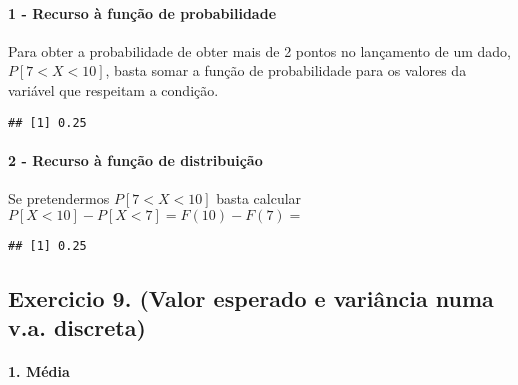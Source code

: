 \documentclass[
]{article}
\newenvironment{Shaded}{\begin{snugshade}}{\end{snugshade}}
\newcommand{\DecValTok}[1]{\textcolor[rgb]{0.00,0.00,0.81}{#1}}
\newcommand{\FunctionTok}[1]{\textcolor[rgb]{0.00,0.00,0.00}{#1}}
\newcommand{\NormalTok}[1]{#1}
\newcommand{\SpecialCharTok}[1]{\textcolor[rgb]{0.00,0.00,0.00}{#1}}
\begin{document}
\hypertarget{recurso-uxe0-funuxe7uxe3o-de-probabilidade-2}{%
\paragraph{1 - Recurso à função de
probabilidade}\label{recurso-uxe0-funuxe7uxe3o-de-probabilidade-2}}

Para obter a probabilidade de obter mais de 2 pontos no lançamento de um
dado, \(P[7 < X < 10]\), basta somar a função de probabilidade para os
valores da variável que respeitam a condição.

\begin{Shaded}
\end{Shaded}

\begin{verbatim}
## [1] 0.25
\end{verbatim}

\hypertarget{recurso-uxe0-funuxe7uxe3o-de-distribuiuxe7uxe3o-2}{%
\paragraph{2 - Recurso à função de
distribuição}\label{recurso-uxe0-funuxe7uxe3o-de-distribuiuxe7uxe3o-2}}

Se pretendermos \(P[7 < X < 10]\) basta calcular
\(P[X < 10]-P[X < 7]=F(10)-F(7)=\)

\begin{verbatim}
## [1] 0.25
\end{verbatim}

\hypertarget{exercicio-9.-valor-esperado-e-variuxe2ncia-numa-v.a.-discreta}{%
\subsection{Exercicio 9. (Valor esperado e variância numa v.a.
discreta)}\label{exercicio-9.-valor-esperado-e-variuxe2ncia-numa-v.a.-discreta}}

\hypertarget{muxe9dia}{%
\paragraph{1. Média}\label{muxe9dia}}
\end{document}
